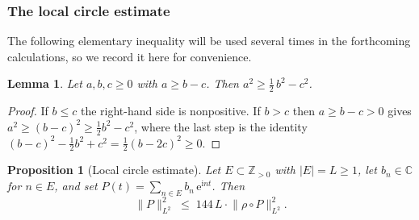 \documentclass[11pt]{amsart}
\newtheorem{proposition}[theorem]{Proposition}
\newtheorem{lemma}[theorem]{Lemma}
\theoremstyle{remark}
\begin{document}
\subsubsection{The local circle estimate}\label{sec:local}

The following elementary inequality will be  used several times in the forthcoming calculations, so we record it here for convenience.

\begin{lemma}\label{lem:safe-square}
Let $a, b, c \ge 0$ with $a \ge b - c$.  Then
$a^2 \ge \tfrac{1}{2}\, b^2 - c^2$.
\end{lemma}

\begin{proof}
If $b \le c$ the right-hand side is nonpositive.  If $b > c$ then
$a \ge b-c > 0$ gives $a^2 \ge (b-c)^2 \ge \tfrac{1}{2}b^2 - c^2$, where
the last step is the identity
$(b-c)^2 - \tfrac{1}{2}b^2 + c^2 = \tfrac{1}{2}(b-2c)^2 \ge 0$.
\end{proof}

\begin{proposition}[Local circle estimate]\label{prop:local-circle} Let $E \subset \mathbb{Z}_{>0}$ with $\lvert E \rvert = L \ge 1$, let $b_n \in \mathbb{C}$ for
$n \in E$, and set $P(t) = \sum_{n \in E} b_n\,\mathrm{e}^{\mathrm{i} nt}$.  Then
\[
\lVert P \rVert_{L^2}^2
\;\le\;
144\, L \cdot \lVert \rho \circ P \rVert_{L^2}^2.
\]
\end{proposition}
\end{document}
